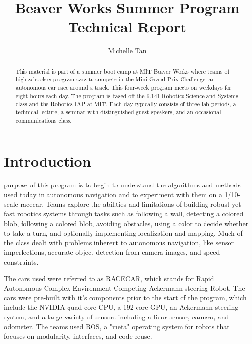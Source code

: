 \documentclass[journal, a4paper]{IEEEtran}
\begin{document}
    \title{Beaver Works Summer Program Technical Report}
    \author{Michelle Tan}
    \maketitle

\begin{abstract}
    This material is part of a summer boot camp at MIT Beaver Works where teams of high schoolers program cars to compete in the Mini Grand Prix Challenge, an autonomous car race around a track. This four-week program meets on weekdays for eight hours each day. The program is based off the 6.141 Robotics Science and Systems class and the Robotics IAP at MIT. Each day typically consists of three lab periods, a technical lecture, a seminar with distinguished guest speakers, and an occasional communications class. 
\end{abstract}
\section{Introduction}
     purpose of this program is to begin to understand the algorithms and methods used today in autonomous navigation and to experiment with them on a 1/10-scale racecar. Teams explore the abilities and limitations of building robust yet fast robotics systems through tasks such as following a wall, detecting a colored blob, following a colored blob, avoiding obstacles, using a color to decide whether to take a turn, and optionally implementing localization and mapping. Much of the class dealt with problems inherent to autonomous navigation, like sensor imperfections, accurate object detection from camera images, and speed constraints. 
    \par The cars used were referred to as RACECAR, which stands for Rapid Autonomous Complex-Environment Competing Ackermann-steering Robot. The cars were pre-built with it’s components prior to the start of the program, which include the NVIDIA quad-core CPU, a 192-core GPU, an Ackermann-steering system, and a large variety of sensors including a lidar sensor, camera, and odometer. The teams used ROS, a "meta" operating system for robots that focuses on modularity, interfaces, and code reuse. \cite{plecture2} 
\end{document}
